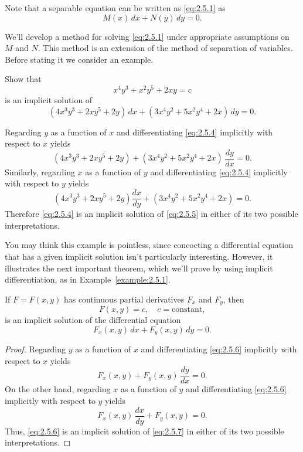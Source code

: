 \documentclass{ximera}
\begin{document}
Note that a separable equation can be written as
\eqref{eq:2.5.1} as
$$
M(x)\,dx+N(y)\,dy=0.
$$


We'll  develop a method for solving \eqref{eq:2.5.1} under appropriate
assumptions on $M$ and $N$. This method is an extension
of the method of separation of variables.
Before stating it we
consider an  example.

\begin{example}\label{example:2.5.1}
Show that
\begin{equation} \label{eq:2.5.4}
x^4y^3+x^2y^5+2xy=c
\end{equation}
is an implicit solution of
\begin{equation} \label{eq:2.5.5}
(4x^3y^3+2xy^5+2y)\,dx+(3x^4y^2+5x^2y^4+2x)\,dy=0.
\end{equation}

\begin{explanation}
Regarding $y$ as a function of $x$ and
differentiating \eqref{eq:2.5.4} implicitly with respect to
$x$ yields
$$
(4x^3y^3+2xy^5+2y)+(3x^4y^2+5x^2y^4+2x)\,\frac{dy}{dx}=0.
$$
Similarly, regarding $x$ as a function of $y$ and
differentiating \eqref{eq:2.5.4} implicitly with respect to
$y$ yields
$$
(4x^3y^3+2xy^5+2y)\frac{dx}{dy}+(3x^4y^2+5x^2y^4+2x)=0.
$$
Therefore \eqref{eq:2.5.4} is an implicit solution of \eqref{eq:2.5.5}
in either of its two possible interpretations.
\end{explanation}
\end{example}

You may think this example is pointless, since
concocting a differential equation that has a given implicit solution
isn't particularly interesting. However, it illustrates the
next important theorem, which  we'll prove by using implicit
differentiation,  as  in  Example~\ref{example:2.5.1}.

\begin{theorem}\label{thmtype:2.5.1}
If $F=F(x,y)$ has continuous partial derivatives
$F_x$ and $F_y$, then
\begin{equation} \label{eq:2.5.6}
F(x,y)=c,\quad c=\text{constant},
\end{equation}
is an implicit solution of the differential equation
\begin{equation} \label{eq:2.5.7}
F_x(x,y)\,dx+F_y(x,y)\,dy=0.
\end{equation}
\end{theorem}

\begin{proof} Regarding $y$ as a function of $x$ and  differentiating
\eqref{eq:2.5.6}  implicitly with respect to $x$ yields
$$
F_x(x,y)+F_y(x,y)\,\frac{dy}{dx}=0.
$$
On the other hand,
 regarding $x$ as a function of $y$ and  differentiating
\eqref{eq:2.5.6}  implicitly with respect to $y$ yields
$$
F_x(x,y)\,\frac{dx}{dy}+F_y(x,y)=0.
$$
Thus, \eqref{eq:2.5.6} is an
implicit solution of  \eqref{eq:2.5.7} in either of its two possible
interpretations.
\end{proof}
\end{document}
